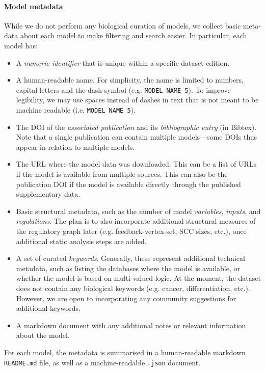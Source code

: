 \documentclass{article}
\begin{document}
\paragraph{Model metadata} While we do not perform any biological curation of models, we collect basic meta-data about each model to make filtering and search easier. In particular, each model has:
\begin{itemize}
	\item A \emph{numeric identifier} that is unique within a specific dataset edition.
	\item A human-readable name. For simplicity, the name is limited to numbers, capital letters and the dash symbol (e.g. \texttt{MODEL-NAME-5}). To improve legibility, we may use spaces instead of dashes in text that is not meant to be machine readable (i.e. \texttt{MODEL NAME 5}).
	\item The DOI of the \emph{associated publication} and its \emph{bibliographic entry} (in Bibtex). Note that a single publication can contain multiple models---some DOIs thus appear in relation to multiple models.
	\item The URL where the model data was downloaded. This can be a list of URLs if the model is available from multiple sources. This can also be the publication DOI if the model is available directly through the published supplementary data.
	\item Basic structural metadata, such as the number of model \emph{variables}, \emph{inputs}, and \emph{regulations}. The plan is to also incorporate additional structural measures of the regulatory graph later (e.g. feedback-vertex-set, SCC sizes, etc.), once additional static analysis steps are added.
	\item A set of curated \emph{keywords}. Generally, these represent additional technical metadata, such as listing the databases where the model is available, or whether the model is based on multi-valued logic. At the moment, the dataset does not contain any biological keywords (e.g. cancer, differentiation, etc.). However, we are open to incorporating any community suggestions for additional keywords.
	\item A markdown document with any additional notes or relevant information about the model.
\end{itemize}

For each model, the metadata is summarised in a human-readable markdown \texttt{README.md} file, as well as a machine-readable \texttt{.json} document.
\end{document}
